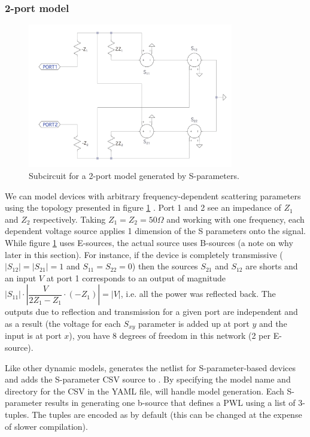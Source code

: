 \subsubsection{2-port model}

\begin{figure}
    \centering
    \includegraphics[width=0.8\textwidth]{figs/2port.png}
    \caption{Subcircuit for a 2-port model generated by S-parameters.}
    \label{fig:2port}
\end{figure}

We can model devices with arbitrary frequency-dependent scattering parameters 
using the topology presented in figure \ref{fig:2port} \cite{microsim}. Port 1 and 2 see
an impedance of $Z_1$ and $Z_2$ respectively. Taking $Z_1=Z_2=50\Omega$ and
working with one frequency, each dependent voltage source applies 1 dimension
of the S parameters onto the signal. While figure \ref{fig:2port} uses E-sources,
the actual source uses B-sources (a note on why later in this section).
For instance, if the device is completely
transmissive ($|S_{12}|=|S_{21}|=1$ and $S_{11}=S_{22}=0$) then the sources $S_{21}$
and $S_{12}$ are shorts and an input $V$ at port 1 corresponds to an output of 
magnitude $|S_{11}|\cdot \left|\dfrac{V}{2Z_1-Z_1}\cdot (-Z_1)\right|=|V|$, i.e.
all the power was reflected back. The outputs due to reflection and transmission 
for a given port are independent and as a result (the voltage for each $S_{xy}$ parameter is
added up at port $y$ and the input is at port $x$), you have 8 degrees of freedom in this
network (2 per E-source).

Like other dynamic models,  generates the netlist for S-parameter-based
devices and adds the S-parameter CSV source to . By specifying
the model name and directory for the CSV in the YAML file,  will handle model 
generation. Each S-parameter results in generating one b-source that defines a PWL using
a list of 3-tuples. The tuples are encoded as  by default (this 
can be changed at the expense of slower compilation).

